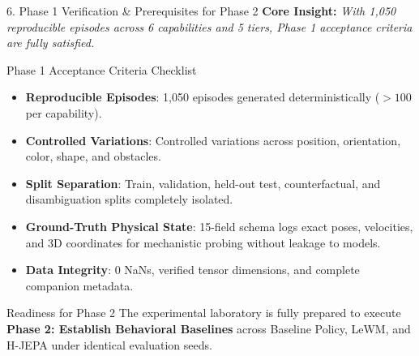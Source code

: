 \documentclass[aspectratio=169, 10pt]{beamer}
\begin{document}
\begin{frame}{6. Phase 1 Verification \& Prerequisites for Phase 2}
  \textbf{Core Insight:} \textit{With 1,050 reproducible episodes across 6 capabilities and 5 tiers, Phase 1 acceptance criteria are fully satisfied.}

  \vspace{0.3cm}
  \begin{block}{Phase 1 Acceptance Criteria Checklist}
    \small
    \begin{itemize}
      \item[\checkmark] \textbf{Reproducible Episodes}: 1,050 episodes generated deterministically ($>100$ per capability).
      \item[\checkmark] \textbf{Controlled Variations}: Controlled variations across position, orientation, color, shape, and obstacles.
      \item[\checkmark] \textbf{Split Separation}: Train, validation, held-out test, counterfactual, and disambiguation splits completely isolated.
      \item[\checkmark] \textbf{Ground-Truth Physical State}: 15-field schema logs exact poses, velocities, and 3D coordinates for mechanistic probing without leakage to models.
      \item[\checkmark] \textbf{Data Integrity}: 0 NaNs, verified tensor dimensions, and complete companion metadata.
    \end{itemize}
  \end{block}

  \vspace{0.2cm}
  \begin{alertblock}{Readiness for Phase 2}
    \small
    The experimental laboratory is fully prepared to execute \textbf{Phase 2: Establish Behavioral Baselines} across Baseline Policy, LeWM, and H-JEPA under identical evaluation seeds.
  \end{alertblock}
\end{frame}
\end{document}
